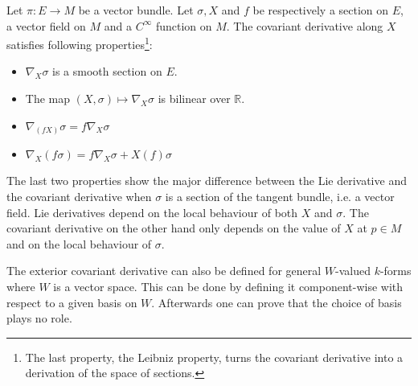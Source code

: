 	\begin{property}
		Let $\pi:E\rightarrow M$ be a vector bundle. Let $\sigma, X$ and $f$ be respectively a section on $E$, a vector field on $M$ and a $C^\infty$ function on $M$. The covariant derivative along $X$ satisfies following properties\footnote{The last property, the Leibniz property, turns the covariant derivative into a derivation of the space of sections.}:
		\begin{itemize}
			\item $\nabla_X\sigma$ is a smooth section on $E$.
			\item The map $(X, \sigma)\mapsto\nabla_X\sigma$ is bilinear over $\mathbb{R}$.
			\item $\nabla_{(fX)}\sigma = f\nabla_X\sigma$
			\item $\nabla_X(f\sigma) = f\nabla_X\sigma + X(f)\sigma$
		\end{itemize}
	\end{property}
	\begin{remark}
		The last two properties show the major difference between the Lie derivative and the covariant derivative when $\sigma$ is a section of the tangent bundle, i.e. a vector field. Lie derivatives depend on the local behaviour of both $X$ and $\sigma$. The covariant derivative on the other hand only depends on the value of $X$ at $p\in M$ and on the local behaviour of $\sigma$.
	\end{remark}
	
	
	\begin{remark}
		The exterior covariant derivative can also be defined for general $W$-valued $k$-forms where $W$ is a vector space. This can be done by defining it component-wise with respect to a given basis on $W$. Afterwards one can prove that the choice of basis plays no role.
	\end{remark}
	
